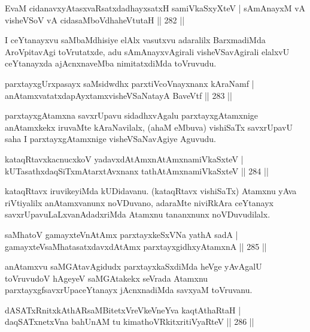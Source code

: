 \begin{shl}
EvaM cidanavxyAtasxvaRsatxdadhayxsatxH samiVkaSxyXteV |
sAmAnayxM vA visheVSoV vA cidasaMboVdhaheVtutaH \hfill || 282 ||
\end{shl}

\begin{artha}
I ceYtanayxvu saMbaMdhisiye elAlx vasutxvu adaralilx BarxmadiMda AroVpitavAgi toVrutatxde, adu sAmAnayxvAgirali visheVSavAgirali elalxvU ceYtanayxda ajAcnxnaveMba nimitatxdiMda toVruvudu.
\end{artha}

\begin{shl}
parxtayxgUrxpasayx saMsidwdhx parxtiVcoV\s nayxnanx kAraNamf |
anAtamxvatatxdapAyxtamxvisheVSaNatayA BaveVtf \hfill || 283 ||
\end{shl}

\begin{artha}
parxtayxgAtamxna savxrUpavu sidadhxvAgalu parxtayxgAtamxnige anAtamxkekx iruvaMte kAraNavilalx, (ahaM eMbuva) vishiSaTx savxrUpavU saha I parxtayxgAtamxnige visheVSaNavAgiye Aguvudu.
\end{artha}

\begin{shl}
kataqRtavxkacnucxkoV yadavxdAtAmx\s nAtAmxnamiVkaSxteV |
kUTasathxdaqSiTxmAtarxtAvxnanx tathA\s \s tAmxnamiVkaSxteV \hfill || 284 ||
\end{shl}

\begin{artha}
kataqRtavx iruvikeyiMda kUDidavanu. (kataqRtavx vishiSaTx) Atamxnu yAva riVtiyalilx anAtamxvanunx noVDuvano, adaraMte niviRkAra ceYtanayx savxrUpavuLaLxvanAdadxriMda Atamxnu tananxnunx noVDuvudilalx.
\end{artha}

\begin{shl}
saMhatoV gamayxteV\s nAtAmx parxtayxkeSxVNa yathA sadA |
gamayxteV\s saMhatasatxdavxdAtAmx parxtayxgidhxyA\s \s tamxnA \hfill || 285 ||
\end{shl}

\begin{artha}
anAtamxvu saMGAtavAgidudx parxtayxkaSxdiMda heVge yAvAgalU toVruvudoV hAgeyeV saMGAtakekx seVrada Atamxnu parxtayxgfsavxrUpaceYtanayx jAcnxnadiMda savxyaM toVruvanu.
\end{artha}

\begin{shl}
dASATxRnitxkAthARsaMBitetxVreVkeVneYva kaqtAthaRtaH |
daqSATxnetxVna bahUnAM tu kimathoVRkitxritiVyaRteV \hfill || 286 ||
\end{shl}


